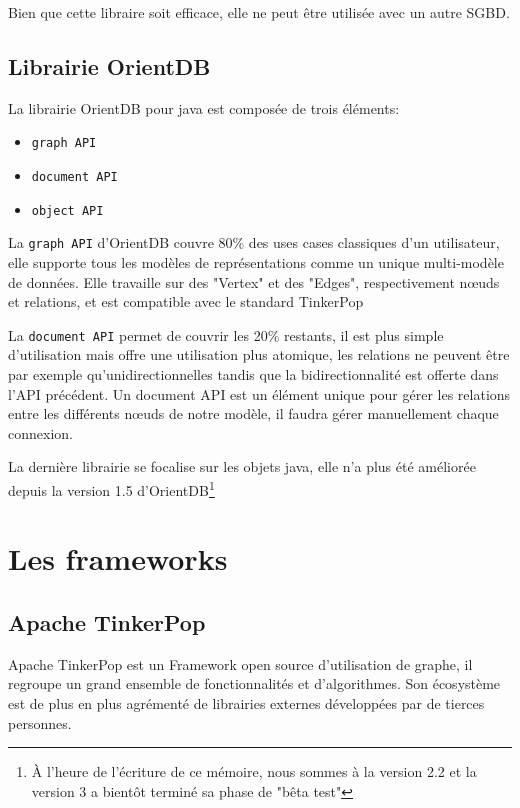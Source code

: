 \documentclass[a4paper,fleqn,12pt]{report}
\begin{document}
Bien que cette libraire soit efficace, elle ne peut être utilisée avec un autre SGBD. 

\subsection{Librairie OrientDB}

La librairie OrientDB pour java est composée de trois éléments:

\begin{itemize}
\item \texttt{graph API}
\item \texttt{document API}
\item \texttt{object API}
\end{itemize}

La \texttt{graph API} d’OrientDB couvre 80\% des uses cases classiques d’un utilisateur, elle supporte tous les modèles de représentations comme un unique multi-modèle de données. Elle travaille sur des "Vertex" et des "Edges", respectivement nœuds et relations, et est compatible avec le standard TinkerPop

La \texttt{document API} permet de couvrir les 20\% restants, il est plus simple d’utilisation mais offre une utilisation plus atomique, les relations ne peuvent être par exemple qu’unidirectionnelles tandis que la bidirectionnalité est offerte dans l’API précédent. Un document API est un élément unique pour gérer les relations entre les différents nœuds de notre modèle, il faudra gérer manuellement chaque connexion.

La dernière librairie se focalise sur les objets java, elle n'a plus été améliorée depuis la version 1.5 d'OrientDB\footnote{À l'heure de l'écriture de ce mémoire, nous sommes à la version 2.2 et la version 3 a bientôt terminé sa phase de "bêta test"}

\section{Les frameworks}

\subsection{Apache TinkerPop}

Apache TinkerPop est un Framework open source d’utilisation de graphe, il regroupe un grand ensemble de fonctionnalités et d’algorithmes. Son écosystème est de plus en plus agrémenté de librairies externes développées par de tierces personnes.
\end{document}
